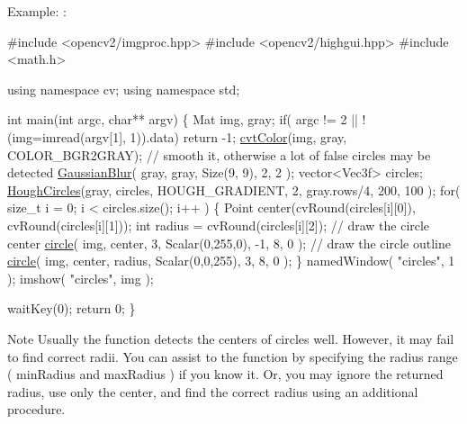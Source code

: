 Example\+: \+: 
\begin{DoxyPre}
\begin{DoxyCode}
\textcolor{preprocessor}{#include <opencv2/imgproc.hpp>}
\textcolor{preprocessor}{#include <opencv2/highgui.hpp>}
\textcolor{preprocessor}{#include <math.h>}

\textcolor{keyword}{using namespace }cv;
\textcolor{keyword}{using namespace }std;

\textcolor{keywordtype}{int} main(\textcolor{keywordtype}{int} argc, \textcolor{keywordtype}{char}** argv)
\{
    Mat img, gray;
    \textcolor{keywordflow}{if}( argc != 2 || !(img=imread(argv[1], 1)).data)
        \textcolor{keywordflow}{return} -1;
    \hyperlink{group__imgproc__misc_gaab99985581c43cce9df680e6586cb9ef}{cvtColor}(img, gray, COLOR\_BGR2GRAY);
    \textcolor{comment}{// smooth it, otherwise a lot of false circles may be detected}
    \hyperlink{group__imgproc__filter_gaf8f0c37e9b9c420a8edfc2753c8fe966}{GaussianBlur}( gray, gray, Size(9, 9), 2, 2 );
    vector<Vec3f> circles;
    \hyperlink{group__imgproc__feature_ga600228eea1d6673137492fb0d0c1b8d5}{HoughCircles}(gray, circles, HOUGH\_GRADIENT,
                 2, gray.rows/4, 200, 100 );
    \textcolor{keywordflow}{for}( \textcolor{keywordtype}{size\_t} i = 0; i < circles.size(); i++ )
    \{
         Point center(cvRound(circles[i][0]), cvRound(circles[i][1]));
         \textcolor{keywordtype}{int} radius = cvRound(circles[i][2]);
         \textcolor{comment}{// draw the circle center}
         \hyperlink{group__imgproc__draw_ga6f8e5000cb25b63d5885b12d46f52e39}{circle}( img, center, 3, Scalar(0,255,0), -1, 8, 0 );
         \textcolor{comment}{// draw the circle outline}
         \hyperlink{group__imgproc__draw_ga6f8e5000cb25b63d5885b12d46f52e39}{circle}( img, center, radius, Scalar(0,0,255), 3, 8, 0 );
    \}
    namedWindow( \textcolor{stringliteral}{"circles"}, 1 );
    imshow( \textcolor{stringliteral}{"circles"}, img );

    waitKey(0);
    \textcolor{keywordflow}{return} 0;
\}
\end{DoxyCode}
 \end{DoxyPre}
 

\begin{DoxyNote}{Note}
Usually the function detects the centers of circles well. However, it may fail to find correct radii. You can assist to the function by specifying the radius range ( min\+Radius and max\+Radius ) if you know it. Or, you may ignore the returned radius, use only the center, and find the correct radius using an additional procedure. 
\end{DoxyNote}

